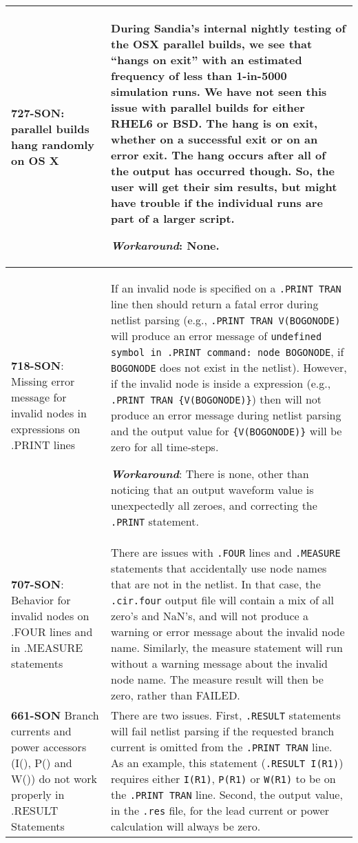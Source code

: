 {\begin{longtable}[h] {>{\raggedright\small}m{2in}|>{\raggedright\let\\\tabularnewline\small}m{3.5in}}
\textbf{727-SON}: \Xyce{} parallel builds hang randomly on OS X & During
Sandia's internal nightly testing of the OSX parallel builds, we see
that \Xyce{} ``hangs on exit'' with an estimated frequency of less
than 1-in-5000 simulation runs.  We have not seen this issue with
parallel builds for either RHEL6 or BSD.  The hang is on exit, whether
on a successful exit or on an error exit.  The hang occurs after all
of the \Xyce{} output has occurred though.  So, the user will get
their sim results, but might have trouble if the individual \Xyce{}
runs are part of a larger script.

\textbf{\textit{Workaround}}: None. \\ \hline

\textbf{718-SON}: Missing error message for invalid nodes in expressions on
.PRINT lines & If an invalid node is specified on
a \Xyce{} \texttt{.PRINT TRAN} line then \Xyce{} should return a fatal
error during netlist parsing (e.g., \texttt{.PRINT TRAN V(BOGONODE)}
will produce an error message of \texttt{undefined symbol in .PRINT
command: node BOGONODE}, if \texttt{BOGONODE} does not exist in the
netlist).  However, if the invalid node is inside a \Xyce{} expression
(e.g., \texttt{.PRINT TRAN \{V(BOGONODE)\}}) then \Xyce{} will not
produce an error message during netlist parsing and the output value
for \texttt{\{V(BOGONODE)\}} will be zero for all time-steps.

\textbf{\textit{Workaround}}: There is none, other than noticing that an output
waveform value is unexpectedly all zeroes, and correcting
the \texttt{.PRINT} statement. \\ \hline

\textbf{707-SON}: Behavior for invalid nodes on .FOUR lines and in .MEASURE
statements & There are issues with \texttt{.FOUR} lines
and \texttt{.MEASURE} statements that accidentally use node names that
are not in the netlist.  In that case, the \texttt{.cir.four} output
file will contain a mix of all zero's and NaN's, and \Xyce{} will not
produce a warning or error message about the invalid node name.
Similarly, the measure statement will run without a warning message
about the invalid node name.  The measure result will then be zero,
rather than FAILED. \\ \hline

\textbf{661-SON} Branch currents and power accessors (I(), P() and W()) do
not work properly in .RESULT Statements & There are two issues.
First, \texttt{.RESULT} statements will fail netlist parsing if the
requested branch current is omitted from the \texttt{.PRINT TRAN}
line.  As an example, this statement (\texttt{.RESULT I(R1)}) requires
either \texttt{I(R1)},
\texttt{P(R1)} or \texttt{W(R1)} to be on the \texttt{.PRINT TRAN} line.
Second, the output value, in the \texttt{.res} file, for the lead
current or power calculation will always be zero.
\\ \hline


\end{longtable}}
